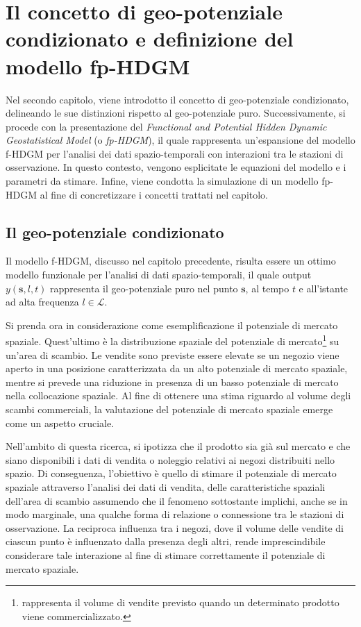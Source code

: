 \chapter[Il concetto di geo-potenziale condizionato e il modello fp-HDGM]{Il concetto di geo-potenziale condizionato e definizione del modello fp-HDGM}
Nel secondo capitolo, viene introdotto il concetto di geo-potenziale condizionato, delineando le sue distinzioni rispetto al geo-potenziale puro. Successivamente, si procede con la presentazione del \textit{Functional and Potential Hidden Dynamic Geostatistical Model} (o \textit{fp-HDGM}), il quale rappresenta un'espansione del modello f-HDGM per l'analisi dei dati spazio-temporali con interazioni tra le stazioni di osservazione. In questo contesto, vengono esplicitate le equazioni del modello e i parametri da stimare. Infine, viene condotta la simulazione di un modello fp-HDGM al fine di concretizzare i concetti trattati nel capitolo.

\section[Il geo-potenziale condizionato]{Il geo-potenziale condizionato}
Il modello f-HDGM, discusso nel capitolo precedente, risulta essere un ottimo modello funzionale per l'analisi di dati spazio-temporali, il quale output $y(\mathbf{s}, l, t)$ rappresenta il geo-potenziale puro nel punto $\mathbf{s}$, al tempo $t$ e all'istante ad alta frequenza $l\in\mathcal{L}$.
\par Si prenda ora in considerazione come esemplificazione il potenziale di mercato spaziale. Quest'ultimo è la distribuzione spaziale del potenziale di mercato\footnote{rappresenta il volume di vendite previsto quando un determinato prodotto viene commercializzato.} su un'area di scambio.
Le vendite sono previste essere elevate se un negozio viene aperto in una posizione caratterizzata da un alto potenziale di mercato spaziale, mentre si prevede una riduzione in presenza di un basso potenziale di mercato nella collocazione spaziale.
Al fine di ottenere una stima riguardo al volume degli scambi commerciali, la valutazione del potenziale di mercato spaziale emerge come un aspetto cruciale.
\par Nell'ambito di questa ricerca, si ipotizza che il prodotto sia già sul mercato e che siano disponibili i dati di vendita o noleggio relativi ai negozi distribuiti nello spazio. Di conseguenza, l'obiettivo è quello di stimare il potenziale di mercato spaziale attraverso l'analisi dei dati di vendita, delle caratteristiche spaziali dell'area di scambio assumendo che il fenomeno sottostante implichi, anche se in modo marginale, una qualche forma di relazione o connessione tra le stazioni di osservazione. La reciproca influenza tra i negozi, dove il volume delle vendite di ciascun punto è influenzato dalla presenza degli altri, rende imprescindibile considerare tale interazione al fine di stimare correttamente il potenziale di mercato spaziale.

